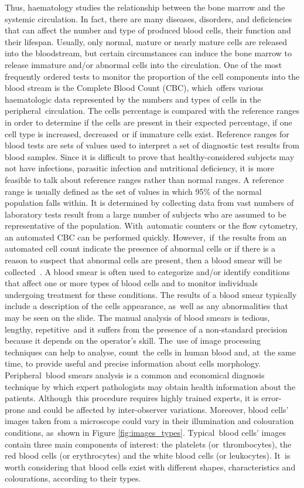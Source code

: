 \documentclass[sensors,review,accept,moreauthors,pdftex,10pt,a4paper]{mdpi}
\begin{document}
Thus, haematology studies the relationship between the bone marrow and the systemic circulation. In fact, there are many diseases, disorders, and deficiencies that can affect the number and type of produced blood cells, their function and their lifespan. Usually, only normal, mature or nearly mature cells are released into the bloodstream, but certain circumstances can induce the bone marrow to release immature and/or abnormal cells into the circulation. One of the most frequently ordered tests to monitor the proportion of the cell components into the blood stream is the Complete Blood Count (CBC), which~offers various haematologic data represented by the numbers and types of cells in the peripheral~circulation. The cells percentage is compared with the reference ranges in order to determine if the cells are present in their expected percentage, if one cell type is increased, decreased~or if immature cells exist. Reference ranges for blood tests are sets of values used to interpret a set of diagnostic test results from blood samples. Since it is difficult to prove that healthy-considered subjects may not have infections, parasitic infection and nutritional deficiency, it is more feasible to talk about reference ranges rather than normal ranges. A reference range is usually defined as the set of values in which 95\% of the normal population falls within. It is determined by collecting data from vast numbers of laboratory tests result from a large number of subjects who are assumed to be representative of the population. With~automatic counters or the flow cytometry, an automated CBC can be performed quickly. \mbox{However, if the} results from an automated cell count indicate the presence of abnormal cells or if there is a reason to suspect that abnormal cells are present, then a blood smear will be collected~\cite{Loddo2016}. A blood smear is often used to categorize and/or identify conditions that affect one or more types of blood cells and to monitor individuals undergoing treatment for these conditions. The results of a blood smear typically include a description of the cells appearance, as~well as any abnormalities that may be seen on the slide. The manual analysis of blood smears is tedious, lengthy, repetitive~and it suffers from the presence of a non-standard precision because it depends on the operator's skill. The~use of image processing techniques can help to analyse, count~the cells in human blood and, at~the same time, to provide useful and precise information about cells morphology.
Peripheral~blood smears analysis is a common and economical diagnosis technique by which expert pathologists may obtain health information about the patients. Although~this procedure requires highly trained experts, it is error-prone and could be affected by inter-observer variations. Moreover, blood cells' images taken from a microscope could vary in their illumination and colouration conditions, as~shown in Figure \ref{fig:images_types}. Typical~blood cells' images contain three main components of interest: the platelets (or~thrombocytes), the red blood cells (or erythrocytes) and the white blood cells (or leukocytes). It~is worth considering that blood cells exist with different shapes, characteristics and colourations, according to their types.
\end{document}
